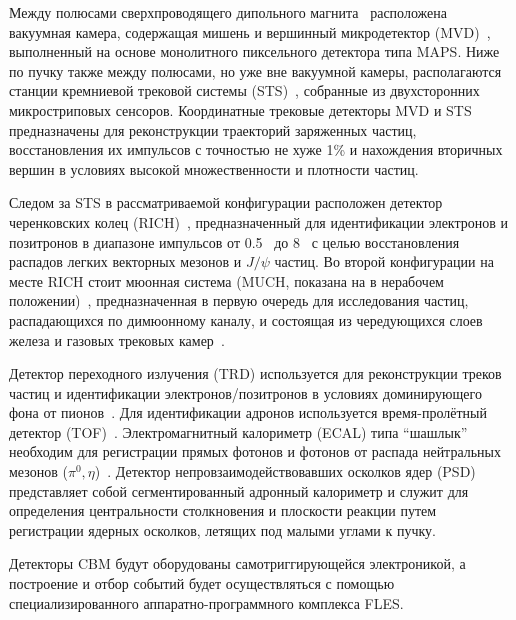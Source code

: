 
Между полюсами сверхпроводящего дипольного магнита~\cite{TDR_Magnet} расположена вакуумная камера, содержащая мишень и вершинный микродетектор (MVD)~\cite{MVD_KOZIEL}, выполненный на основе монолитного пиксельного детектора типа MAPS. Ниже по пучку также между полюсами, но уже вне вакуумной камеры, располагаются станции кремниевой трековой системы (STS)~\cite{TDR_STS}, собранные из двухсторонних микростриповых сенсоров. Координатные трековые детекторы MVD и STS предназначены для реконструкции траекторий заряженных частиц, восстановления их импульсов с точностью не хуже 1\% и нахождения вторичных вершин в условиях высокой множественности и плотности частиц.


Следом за STS в рассматриваемой конфигурации расположен детектор черенковских колец (RICH)~\cite{TDR_RICH}, предназначенный для идентификации электронов и позитронов в диапазоне импульсов от 0.5~\GeVoverC{} до 8~\GeVoverC{} с целью восстановления распадов легких векторных мезонов и $J/\psi$ частиц. Во второй конфигурации на месте RICH стоит мюонная система (MUCH, показана на  в нерабочем положении)~\cite{TDR_MUCH}, предназначенная в первую очередь для исследования частиц, распадающихся по димюонному каналу, и состоящая из чередующихся слоев железа и газовых трековых камер~\cite{GEM}.

Детектор переходного излучения (TRD) используется для реконструкции треков частиц и идентификации электронов/позитронов в условиях доминирующего фона от пионов~\cite{TRD}. Для идентификации адронов используется время-пролётный детектор (TOF)~\cite{TDR_TOF}. Электромагнитный калориметр (ECAL) типа ``шашлык'' необходим для регистрации прямых фотонов и фотонов от распада нейтральных мезонов ($ \pi^{0}, \eta $)~\cite{ECAL_KOROLKO}. Детектор непровзаимодействовавших осколков ядер (PSD)~\cite{TDR_PSD} представляет собой сегментированный адронный калориметр и служит для определения центральности столкновения и плоскости реакции путем регистрации ядерных осколков, летящих под малыми углами к пучку.

Детекторы CBM будут оборудованы самотриггирующейся электроникой, а построение и отбор событий будет осуществляться с помощью специализированного аппаратно-программного комплекса FLES.

